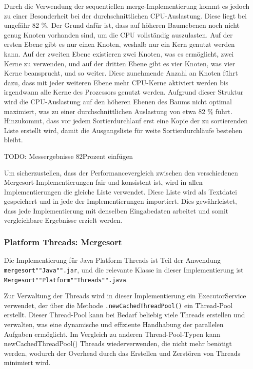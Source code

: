 \documentclass[fontsize=12pt,paper=a4,twoside=semi,parskip=half-,headsepline,headinclude]{scrreprt}
\begin{document}
Durch die Verwendung der sequentiellen merge-Implementierung kommt es jedoch zu einer Besonderheit bei der durchschnittlichen CPU-Auslastung. Diese liegt bei ungefähr 82 \%. Der Grund dafür ist, dass auf höheren Baumebenen noch nicht genug Knoten vorhanden sind, um die CPU vollständig auszulasten. Auf der ersten Ebene gibt es nur einen Knoten, weshalb nur ein Kern genutzt werden kann. Auf der zweiten Ebene existieren zwei Knoten, was es ermöglicht, zwei Kerne zu verwenden, und auf der dritten Ebene gibt es vier Knoten, was vier Kerne beansprucht, und so weiter. Diese zunehmende Anzahl an Knoten führt dazu, dass mit jeder weiteren Ebene mehr CPU-Kerne aktiviert werden bis irgendwann alle Kerne des Prozessors genutzt werden. Aufgrund dieser Struktur wird die CPU-Auslastung auf den höheren Ebenen des Baums nicht optimal maximiert, was zu einer durchschnittlichen Auslastung von etwa 82 \% führt. Hinzukommt, dass vor jedem Sortierdurchlauf erst eine Kopie der zu sortierenden Liste erstellt wird, damit die Ausgangsliste für weite Sortierdurchläufe bestehen bleibt. 

TODO: Messergebnisse 82Prozent einfügen 

Um sicherzustellen, dass der Performancevergleich zwischen den verschiedenen Mergesort-Implementierungen fair und konsistent ist, wird in allen Implementierungen die gleiche Liste verwendet. Diese Liste wird als Textdatei  gespeichert und in jede der Implementierungen importiert. Dies gewährleistet, dass jede Implementierung mit denselben Eingabedaten arbeitet und somit vergleichbare Ergebnisse erzielt werden.

\subsubsection{Platform Threads: Mergesort}

Die Implementierung für Java Platform Threads ist Teil der Anwendung \texttt{mergesort""Java"".jar}, und die relevante Klasse in dieser Implementierung ist \texttt{Mergesort""Platform""Threads"".java}.

Zur Verwaltung der Threads wird in dieser Implementierung ein ExecutorService verwendet, der über die Methode \texttt{.newCachedThreadPool()} ein Thread-Pool erstellt. Dieser Thread-Pool kann bei Bedarf beliebig viele Threads erstellen und verwalten, was eine dynamische und effiziente Handhabung der parallelen Aufgaben ermöglicht. Im Vergleich zu anderen Thread-Pool-Typen kann newCachedThreadPool() Threads wiederverwenden, die nicht mehr benötigt werden, wodurch der Overhead durch das Erstellen und Zerstören von Threads minimiert wird.
\end{document}

